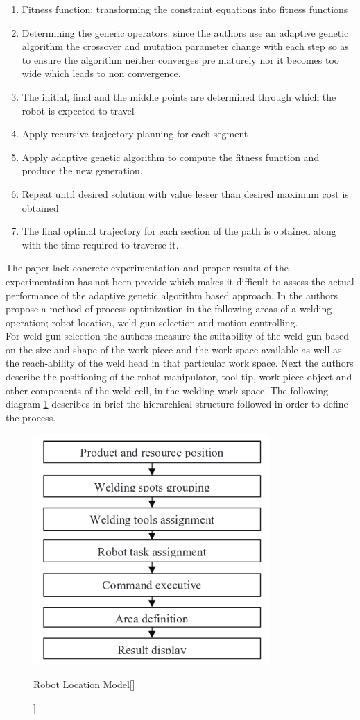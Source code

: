 \begin{enumerate}
\item Fitness function: transforming the constraint equations into fitness functions
\item Determining the generic operators: since the authors use an adaptive genetic algorithm the crossover and mutation parameter change with each step so as to ensure the algorithm neither converges pre maturely nor it becomes too wide which leads to non convergence.
\item The initial, final and the middle points are determined through which the robot is expected to travel
\item Apply recursive trajectory planning for each segment
\item Apply adaptive genetic algorithm to compute the fitness function and produce the new generation.
\item Repeat until desired solution with value lesser than desired maximum cost is obtained
\item The final optimal trajectory for each section of the path is obtained along with the time required to traverse it.
\end{enumerate} 
The paper lack concrete experimentation and proper results of the experimentation has not been provide which makes it difficult to assess the actual performance of the adaptive genetic algorithm based approach. 
In \citet{QiuZhu2011} the authors propose a method of process optimization in the following areas of a welding operation; robot location, weld gun selection and motion controlling.   \\         
For weld gun selection the authors measure the suitability of the weld gun based on the size and shape of the work piece and the work space available as well as the reach-ability of the weld head in that particular work space. Next the authors describe the positioning of the robot manipulator, tool tip, work piece object and other components of the weld cell, in the welding work space. The following diagram \ref{fig:img6} describes in brief the hierarchical structure followed in order to define the process.
\begin{figure}[htbp] %
 \centering
   \includegraphics[width=9cm]{images/robotlocproc.png}
   \caption[Robot Location Model[\citet{QiuZhu2011}]]
   {Robot Location Model[\citet{QiuZhu2011}]}  
\label{fig:img6}
\end{figure}
